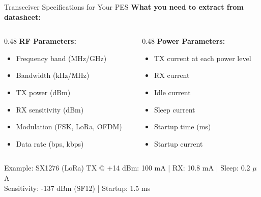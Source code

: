 \documentclass[aspectratio=169,11pt]{beamer}
\begin{document}
\begin{frame}{Transceiver Specifications for Your PES}
    \textbf{What you need to extract from datasheet:}
    
    \vspace{0.3cm}
    \begin{columns}[T]
        \begin{column}{0.48\textwidth}
            \textbf{RF Parameters:}
            \begin{itemize}
                \item Frequency band (MHz/GHz)
                \item Bandwidth (kHz/MHz)
                \item TX power (dBm)
                \item RX sensitivity (dBm)
                \item Modulation (FSK, LoRa, OFDM)
                \item Data rate (bps, kbps)
            \end{itemize}
        \end{column}
        \begin{column}{0.48\textwidth}
            \textbf{Power Parameters:}
            \begin{itemize}
                \item TX current at each power level
                \item RX current
                \item Idle current
                \item Sleep current
                \item Startup time (ms)
                \item Startup current
            \end{itemize}
        \end{column}
    \end{columns}
    
    \vspace{0.3cm}
    \begin{exampleblock}{Example: SX1276 (LoRa)}
        TX @ +14 dBm: 100 mA | RX: 10.8 mA | Sleep: 0.2 $\mu$A\\
        Sensitivity: -137 dBm (SF12) | Startup: 1.5 ms
    \end{exampleblock}
\end{frame}
\end{document}
